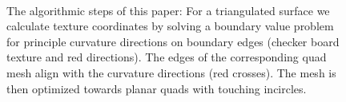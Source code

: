 \documentclass[Thesis.tex]{subfiles}
\begin{document}
\begin{figure}
\centering
{}\\
\caption[Quasiisothermic parameterization step-by-step]{The algorithmic 
steps of this paper: For a triangulated surface we calculate 
texture coordinates by solving a boundary value problem for
principle curvature directions on boundary edges (checker board texture
and red directions). The edges of the corresponding quad mesh
align with the curvature directions (red crosses). The mesh is then
optimized towards planar quads with touching incircles.
}
\label{fig:teaser}
\end{figure}
\end{document}
